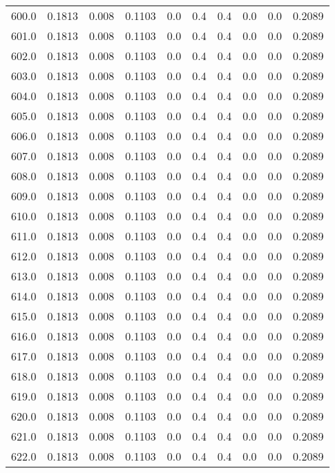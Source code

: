 \begin{longtable}{lrrrrrrrrr}
600.0 & 0.1813 & 0.008 & 0.1103 & 0.0 & 0.4 & 0.4 & 0.0 & 0.0 & 0.2089 \\
601.0 & 0.1813 & 0.008 & 0.1103 & 0.0 & 0.4 & 0.4 & 0.0 & 0.0 & 0.2089 \\
602.0 & 0.1813 & 0.008 & 0.1103 & 0.0 & 0.4 & 0.4 & 0.0 & 0.0 & 0.2089 \\
603.0 & 0.1813 & 0.008 & 0.1103 & 0.0 & 0.4 & 0.4 & 0.0 & 0.0 & 0.2089 \\
604.0 & 0.1813 & 0.008 & 0.1103 & 0.0 & 0.4 & 0.4 & 0.0 & 0.0 & 0.2089 \\
605.0 & 0.1813 & 0.008 & 0.1103 & 0.0 & 0.4 & 0.4 & 0.0 & 0.0 & 0.2089 \\
606.0 & 0.1813 & 0.008 & 0.1103 & 0.0 & 0.4 & 0.4 & 0.0 & 0.0 & 0.2089 \\
607.0 & 0.1813 & 0.008 & 0.1103 & 0.0 & 0.4 & 0.4 & 0.0 & 0.0 & 0.2089 \\
608.0 & 0.1813 & 0.008 & 0.1103 & 0.0 & 0.4 & 0.4 & 0.0 & 0.0 & 0.2089 \\
609.0 & 0.1813 & 0.008 & 0.1103 & 0.0 & 0.4 & 0.4 & 0.0 & 0.0 & 0.2089 \\
610.0 & 0.1813 & 0.008 & 0.1103 & 0.0 & 0.4 & 0.4 & 0.0 & 0.0 & 0.2089 \\
611.0 & 0.1813 & 0.008 & 0.1103 & 0.0 & 0.4 & 0.4 & 0.0 & 0.0 & 0.2089 \\
612.0 & 0.1813 & 0.008 & 0.1103 & 0.0 & 0.4 & 0.4 & 0.0 & 0.0 & 0.2089 \\
613.0 & 0.1813 & 0.008 & 0.1103 & 0.0 & 0.4 & 0.4 & 0.0 & 0.0 & 0.2089 \\
614.0 & 0.1813 & 0.008 & 0.1103 & 0.0 & 0.4 & 0.4 & 0.0 & 0.0 & 0.2089 \\
615.0 & 0.1813 & 0.008 & 0.1103 & 0.0 & 0.4 & 0.4 & 0.0 & 0.0 & 0.2089 \\
616.0 & 0.1813 & 0.008 & 0.1103 & 0.0 & 0.4 & 0.4 & 0.0 & 0.0 & 0.2089 \\
617.0 & 0.1813 & 0.008 & 0.1103 & 0.0 & 0.4 & 0.4 & 0.0 & 0.0 & 0.2089 \\
618.0 & 0.1813 & 0.008 & 0.1103 & 0.0 & 0.4 & 0.4 & 0.0 & 0.0 & 0.2089 \\
619.0 & 0.1813 & 0.008 & 0.1103 & 0.0 & 0.4 & 0.4 & 0.0 & 0.0 & 0.2089 \\
620.0 & 0.1813 & 0.008 & 0.1103 & 0.0 & 0.4 & 0.4 & 0.0 & 0.0 & 0.2089 \\
621.0 & 0.1813 & 0.008 & 0.1103 & 0.0 & 0.4 & 0.4 & 0.0 & 0.0 & 0.2089 \\
622.0 & 0.1813 & 0.008 & 0.1103 & 0.0 & 0.4 & 0.4 & 0.0 & 0.0 & 0.2089 \\

\end{longtable}
